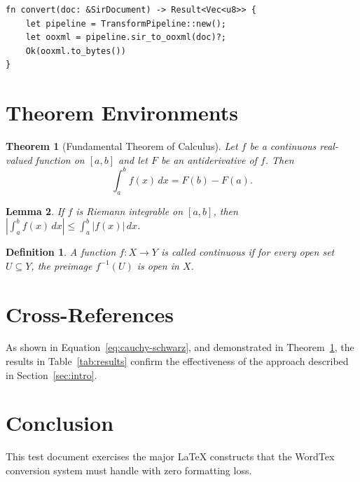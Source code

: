 \documentclass[conference]{IEEEtran}
\begin{document}
\begin{verbatim}
fn convert(doc: &SirDocument) -> Result<Vec<u8>> {
    let pipeline = TransformPipeline::new();
    let ooxml = pipeline.sir_to_ooxml(doc)?;
    Ok(ooxml.to_bytes())
}
\end{verbatim}

\section{Theorem Environments}

\newtheorem{theorem}{Theorem}
\newtheorem{lemma}[theorem]{Lemma}
\newtheorem{definition}{Definition}

\begin{theorem}[Fundamental Theorem of Calculus]
    \label{thm:ftc}
    Let $f$ be a continuous real-valued function on $[a,b]$ and let $F$
    be an antiderivative of $f$. Then
    \begin{equation}
        \int_a^b f(x)\,dx = F(b) - F(a).
    \end{equation}
\end{theorem}

\begin{lemma}
    If $f$ is Riemann integrable on $[a,b]$, then
    $\left|\int_a^b f(x)\,dx\right| \leq \int_a^b |f(x)|\,dx$.
\end{lemma}

\begin{definition}
    A function $f: X \to Y$ is called \emph{continuous} if for every
    open set $U \subseteq Y$, the preimage $f^{-1}(U)$ is open in $X$.
\end{definition}

\section{Cross-References}

As shown in Equation~\eqref{eq:cauchy-schwarz}, and demonstrated
in Theorem~\ref{thm:ftc}, the results in Table~\ref{tab:results}
confirm the effectiveness of the approach described in
Section~\ref{sec:intro}.

\section{Conclusion}

This test document exercises the major LaTeX constructs that the
WordTex conversion system must handle with zero formatting loss.



\end{document}
